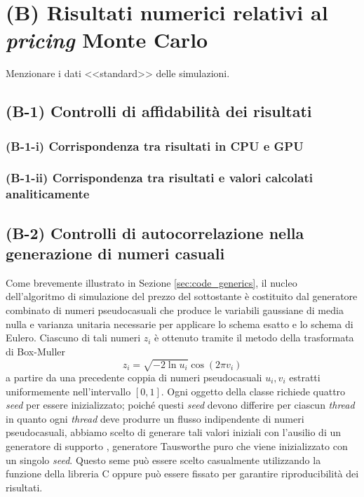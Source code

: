 \chapter{(B) Risultati numerici relativi al \textit{pricing} Monte Carlo}
Menzionare i dati <<standard>> delle simulazioni.
\section{(B-1) Controlli di affidabilità dei risultati}
\subsection{(B-1-i) Corrispondenza tra risultati in CPU e GPU} \label{sec:cpugpu}
\lipsum[1-3]
\subsection{(B-1-ii) Corrispondenza tra risultati e valori calcolati analiticamente}
\lipsum[1-3]


\section{(B-2) Controlli di autocorrelazione nella generazione di numeri casuali}

Come brevemente illustrato in Sezione \ref{sec:code_generics}, il nucleo dell'algoritmo di simulazione del prezzo del sottostante è costituito dal generatore combinato di numeri pseudocasuali che produce le variabili gaussiane di media nulla e varianza unitaria necessarie per applicare lo schema esatto e lo schema di Eulero. Ciascuno di tali numeri $z_i$ è ottenuto tramite il metodo della trasformata di Box-Muller
\begin{equation}
    z_i = \sqrt{-2 \ln{u_i}} \cos{\left(2\pi v_i\right)}
    \label{eq:BoxMuller}
\end{equation}
a partire da una precedente coppia di numeri pseudocasuali $u_i, v_i$ estratti uniformemente nell'intervallo $[0,1]$. Ogni oggetto della classe  richiede quattro \textit{seed} per essere inizializzato; poiché questi \textit{seed} devono differire per ciascun \textit{thread} in quanto ogni \textit{thread} deve produrre un flusso indipendente di numeri pseudocasuali, abbiamo scelto di generare tali valori iniziali con l'ausilio di un generatore di supporto , generatore Tausworthe puro che viene inizializzato con un singolo \textit{seed}. Questo seme può essere scelto casualmente utilizzando la funzione  della libreria C  oppure può essere fissato per garantire riproducibilità dei risultati.

